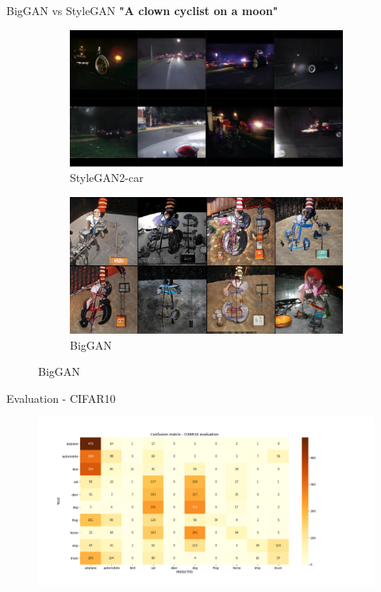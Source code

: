\documentclass[t]{beamer}
\begin{document}
\begin{frame}[c]{BigGAN vs StyleGAN}
\centering
\textbf{"A clown cyclist on a moon"}
\begin{figure}[H]
\centering
\begin{subfigure}[b]{0.5\textwidth}
   \includegraphics[width=1\linewidth, scale=0.15]{clown_stylegancar.PNG}
   \caption{StyleGAN2-car}
   \label{fig:Ng1} 
\end{subfigure}
\begin{subfigure}[b]{0.5\textwidth}
   \includegraphics[width=1\linewidth, scale=0.15]{clown_biggan.PNG}
   \caption{BigGAN}
   \label{fig:Ng2}
\end{subfigure}
\end{figure}
\end{frame}

\begin{frame}[c]{Evaluation - CIFAR10}
\begin{figure}
    \centering
    \includegraphics[scale=0.3]{confusion_matrix.png}
\end{figure} 
\end{frame}
\end{document}
